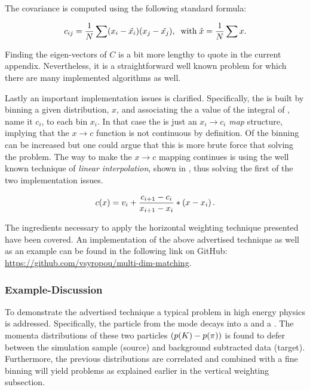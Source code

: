 \noindent The covariance is computed using the following standard formula:

\begin{equation}
\centering
c_{ij} = \frac{1}{N} \sum (x_i-\hat{x_i})(x_j-\hat{x_j}), \;\; \text {with} \; \hat{x} = \frac{1}{N} \sum x.
\label{hor_reww_correlation_formula}
\end{equation}

\noindent Finding the eigen-vectors of $C$ is a bit more lengthy to quote in the current appendix.
Nevertheless, it is a straightforward well known problem for which there are many implemented
algorithms as well.

Lastly an important implementation issues is clarified. Specifically, the \cdf is built by binning a
given distribution, $x$, and associating the a value of the integral of , name it $c_i$,
to each bin $x_i$. In that case  the \cdf is just an $x_i \to c_i$ {\it map}
structure, implying that the $x \to c$ function is not continuous by definition. Of the binning can be increased
but one could argue that this is more brute force that solving the problem. The way to make the $x \to c$ mapping
continues is using the well known technique of {\it linear interpolation}, shown in ,
thus solving the first of the two implementation issues.

\begin{equation}
  c(x) = v_i + \frac{c_{i+1}-c_i}{x_{i+1}-x_i} *  \left( x - x_i \right).
  \label{linear_interpolation}
\end{equation}

The ingredients necessary to apply the horizontal weighting technique presented have been covered.
An implementation of the above advertised technique as well as an example can be found in the following
link on GitHub: \href{https://github.com/vsyropou/multi-dim-matching}{https://github.com/vsyropou/multi-dim-matching}.

\subsubsection{Example-Discussion}
To demonstrate the advertised technique a typical problem in high energy physics is addressed.
Specifically, the \Kstarz particle from the \BsJpsiKst mode decays into a \kaon and a \pion. The momenta
distributions of these two particles $\left( \mbox{$p$}(K)-\mbox{$p$}(\pi) \right)$ is found to defer between
the simulation sample (source) and background subtracted data (target).
Furthermore, the previous distributions are correlated and combined with a fine binning will yield problems as explained
earlier in the vertical weighting subsection.

